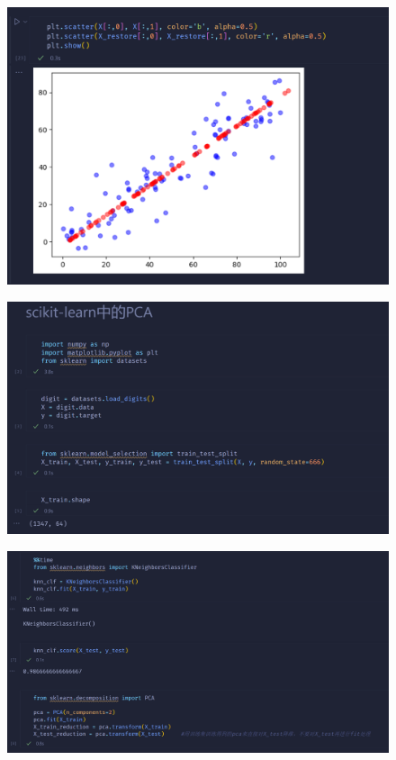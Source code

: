 \documentclass{article}
\begin{document}
\begin{figure}[H]
    \centering
    \includegraphics[width=\linewidth]{6.png}
\end{figure}
\begin{figure}[H]
    \centering
    \includegraphics[width=\linewidth]{7.png}
\end{figure}
\begin{figure}[H]
    \centering
    \includegraphics[width=\linewidth]{8.png}
\end{figure}
\end{document}
